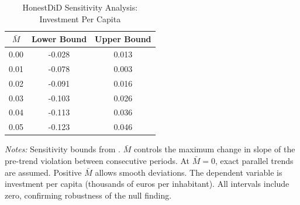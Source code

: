 \begin{table}[htbp]
\centering
\caption{HonestDiD Sensitivity Analysis: Investment Per Capita}
\label{tab:honest_did}
\begin{tabular}{ccc}
\hline\hline
$\bar{M}$ & Lower Bound & Upper Bound \\
\hline
0.00 & -0.028 & 0.013 \\
0.01 & -0.078 & 0.003 \\
0.02 & -0.091 & 0.016 \\
0.03 & -0.103 & 0.026 \\
0.04 & -0.113 & 0.036 \\
0.05 & -0.123 & 0.046 \\
\hline\hline
\end{tabular}
\parbox{\textwidth}{\footnotesize \textit{Notes:} Sensitivity bounds from \citet{rambachan2023more}. $\bar{M}$ controls the maximum change in slope of the pre-trend violation between consecutive periods. At $\bar{M} = 0$, exact parallel trends are assumed. Positive $\bar{M}$ allows smooth deviations. The dependent variable is investment per capita (thousands of euros per inhabitant). All intervals include zero, confirming robustness of the null finding.}
\end{table}
